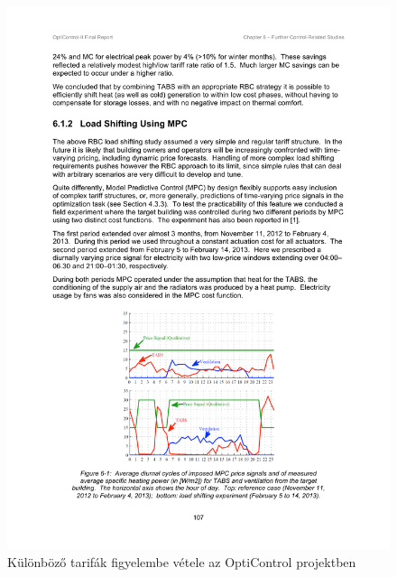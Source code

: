 \begin{figure}[H]
	\centering
	\includegraphics[trim=90 60 90 470, clip,width=\textwidth]{cite/loadshift}
	\caption{Különböző tarifák figyelembe vétele az OptiControl projektben}
	\label{fig:loadshift}
\end{figure}


%
%


